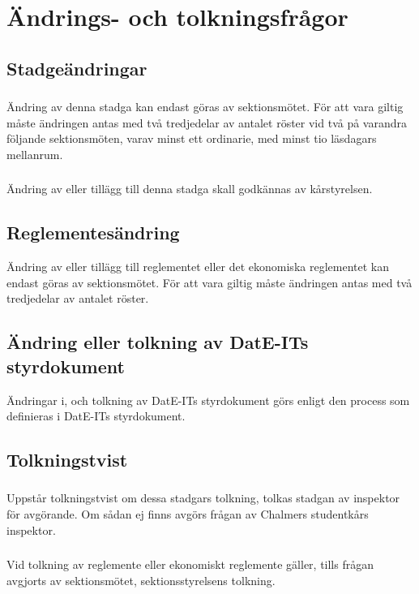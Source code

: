 \documentclass[a4paper]{dtek}
\begin{document}
\section{Ändrings- och tolkningsfrågor}
\subsection{Stadgeändringar}
\subsubsection{}
Ändring av denna stadga kan endast göras av sektionsmötet. För att vara giltig måste ändringen antas med två tredjedelar av antalet röster vid två på varandra följande sektionsmöten, varav minst ett ordinarie, med minst tio läsdagars mellanrum.
\subsubsection{}
Ändring av eller tillägg till denna stadga skall godkännas av kårstyrelsen.
\subsection{Reglementesändring}
Ändring av eller tillägg till reglementet eller det ekonomiska reglementet kan endast göras av sektionsmötet. För att vara giltig måste ändringen antas med två tredjedelar av antalet röster.
\subsection{Ändring eller tolkning av DatE-ITs styrdokument}
Ändringar i, och tolkning av DatE-ITs styrdokument görs enligt den process som definieras i DatE-ITs styrdokument.
\subsection{Tolkningstvist}
\subsubsection{}
Uppstår tolkningstvist om dessa stadgars tolkning, tolkas stadgan av inspektor för avgörande. Om sådan ej finns avgörs frågan av Chalmers studentkårs inspektor.
\subsubsection{}
Vid tolkning av reglemente eller ekonomiskt reglemente gäller, tills frågan avgjorts av sektionsmötet, sektionsstyrelsens tolkning.
\newpage
\end{document}
